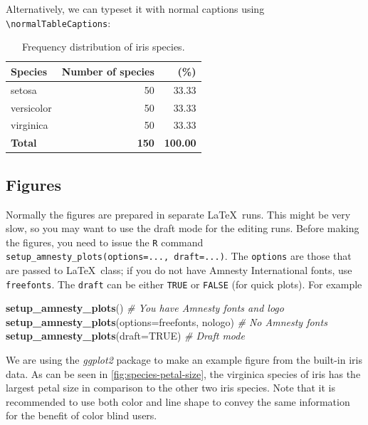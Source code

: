\documentclass[
  freefonts, nologo]{amnestyreport}
\newenvironment{Shaded}{\begin{snugshade}}{\end{snugshade}}
\newcommand{\AttributeTok}[1]{\textcolor[rgb]{0.13,0.29,0.53}{#1}}
\newcommand{\CommentTok}[1]{\textcolor[rgb]{0.56,0.35,0.01}{\textit{#1}}}
\newcommand{\ConstantTok}[1]{\textcolor[rgb]{0.56,0.35,0.01}{#1}}
\newcommand{\FunctionTok}[1]{\textcolor[rgb]{0.13,0.29,0.53}{\textbf{#1}}}
\newcommand{\NormalTok}[1]{#1}
\newcommand{\StringTok}[1]{\textcolor[rgb]{0.31,0.60,0.02}{#1}}
\begin{document}
Alternatively, we can typeset it with normal captions using
\texttt{\textbackslash{}normalTableCaptions}: \normalTableCaptions

\begin{table}[!ht]

\caption{\label{tab:example_table_1}\label{tab:species1}
        Frequency distribution of iris species.}
\centering
\begin{tabular}[t]{lrr}
\toprule
\textbf{Species} & \textbf{Number of species} & \textbf{(\%)}\\
\midrule
setosa & 50 & 33.33\\
versicolor & 50 & 33.33\\
virginica & 50 & 33.33\\
\textbf{Total} & \textbf{150} & \textbf{100.00}\\
\bottomrule
\end{tabular}
\end{table}

\FloatBarrier

\subsection{Figures}\label{figures}

Normally the figures are prepared in separate \LaTeX~runs. This might be
very slow, so you may want to use the draft mode for the editing runs.
Before making the figures, you need to issue the \texttt{R} command
\texttt{setup\_amnesty\_plots(options=...,\ draft=...)}. The
\texttt{options} are those that are passed to \LaTeX~class; if you do
not have Amnesty International fonts, use \texttt{freefonts}. The
\texttt{draft} can be either \texttt{TRUE} or \texttt{FALSE} (for quick
plots). For example

\begin{Shaded}
\begin{Highlighting}[]
\FunctionTok{setup\_amnesty\_plots}\NormalTok{()  }\CommentTok{\# You have Amnesty fonts and logo}
\FunctionTok{setup\_amnesty\_plots}\NormalTok{(}\AttributeTok{options=}\StringTok{\textquotesingle{}freefonts, nologo\textquotesingle{}}\NormalTok{) }\CommentTok{\# No Amnesty fonts}
\FunctionTok{setup\_amnesty\_plots}\NormalTok{(}\AttributeTok{draft=}\ConstantTok{TRUE}\NormalTok{) }\CommentTok{\# Draft mode}
\end{Highlighting}
\end{Shaded}

We are using the \textit{ggplot2} package to make an example figure from
the built-in iris data. As can be seen in
\autoref{fig:species-petal-size}, the virginica species of iris has the
largest petal size in comparison to the other two iris species. Note
that it is recommended to use both color and line shape to convey the
same information for the benefit of color blind users.
\end{document}
